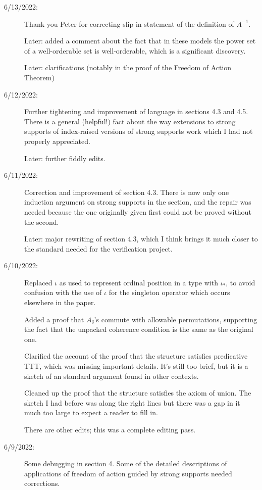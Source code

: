 \documentclass[112pt]{article}
\begin{document}
\begin{description}

\item[6/13/2022:]  Thank you Peter for correcting slip in statement of the definition of $A^{-1}$.

Later:  added a comment about the fact that in these models the power set of a well-orderable set is well-orderable, which is a significant discovery.

Later:  clarifications (notably in the proof of the Freedom of Action Theorem) 

\item[6/12/2022:]  Further tightening and improvement of language in sections 4.3 and 4.5.  There is a general (helpful!) fact about the way extensions to strong supports of index-raised versions of strong supports work which I had not properly appreciated.

Later: further fiddly edits.

\item[6/11/2022:]  Correction and improvement of section 4.3.  There is now only one induction argument on strong supports in the section, and the repair was needed because the one originally given first could not be proved without the second.

Later:  major rewriting of section 4.3, which I think brings it much closer to the standard needed for the verification project.

\item[6/10/2022:]  Replaced $\iota$ as used to represent ordinal position in a type with $\iota_*$, to avoid confusion with the use of $\iota$ for the singleton operator which occurs elsewhere in the paper.

Added a proof that $A_\delta$'s commute with allowable permutations, supporting the fact that the unpacked coherence condition is the same as the original one.

Clarified the account of the proof that the structure satisfies predicative TTT, which was missing important details.   It's still too brief, but it is a sketch of an standard argument found in other contexts.

Cleaned up the proof that the structure satisfies the axiom of union.  The sketch I had before was along the right lines but there was a gap in it much too large to expect a reader to fill in.

There are other edits;  this was a complete editing pass.

\item[6/9/2022:]  Some debugging in section 4.  Some of the detailed descriptions of applications of freedom of action guided by strong supports needed corrections.  


\end{description}
\end{document}
